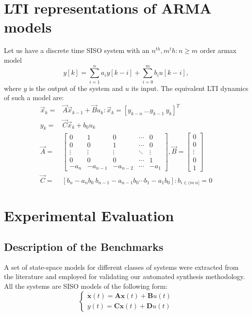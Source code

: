 \documentclass[runningheads,a4paper]{llncs}
\begin{document}
\section{LTI representations of ARMA models}

Let us have a discrete time SISO system with an $n^{th},m{^th} : n\geq m$ order armax model
$$y[k]=\sum_{i=1}^n a_iy[k-i]+\sum_{i=0}^m b_iu[k-i],$$
where $y$ is the output of the system and $u$ its input.
The equivalent LTI dynamics of such a model are:
\begin{align}
\vec{x}_k=&\vec{A}\vec{x}_{k-1}+\vec{B}u_k : \vec{x}_k=[y_{k-n}\ \hdots y_{k-1}\ y_{k}]^T\\
y_k=&\vec{C}\vec{x}_k + b_0u_k\nonumber\\
\vec{A}=&\left[
\begin{array}{ccccc}
0&1&0&\cdots&0\\
0&0&1&\cdots&0\\
\vdots&\vdots&\vdots&\ddots&\vdots\\
0&0&0&\cdots&1\\
-a_n&-a_{n-1}&-a_{n-2}&\cdots&-a_1
\end{array}\right],
\vec{B}=\left[
\begin{array}{c}
0\\0\\ \vdots\\ 0\\ 1
\end{array}\right]\nonumber\\
\vec{C}=&[b_n-a_nb_0\ b_{n-1}-a_{n-1}b_0 \cdots b_1-a_1b_0] : b_{i \in (m\ n]}=0\nonumber
\end{align}

\section{Experimental Evaluation}


\subsection{Description of the Benchmarks}

A set of state-space models for different classes of systems were extracted from the literature and employed for validating our automated synthesis methodology. All the systems are SISO models of the following form:
\begin{equation}
\left\lbrace\begin{array}{c}
\dot{\textbf{x}}(t)=\textbf{A}\textbf{x}(t)+\textbf{B}u(t)\\
y(t)=\textbf{C}\textbf{x}(t)+\textbf{D}u(t)
\end{array}\right.
\end{equation}
\end{document}
